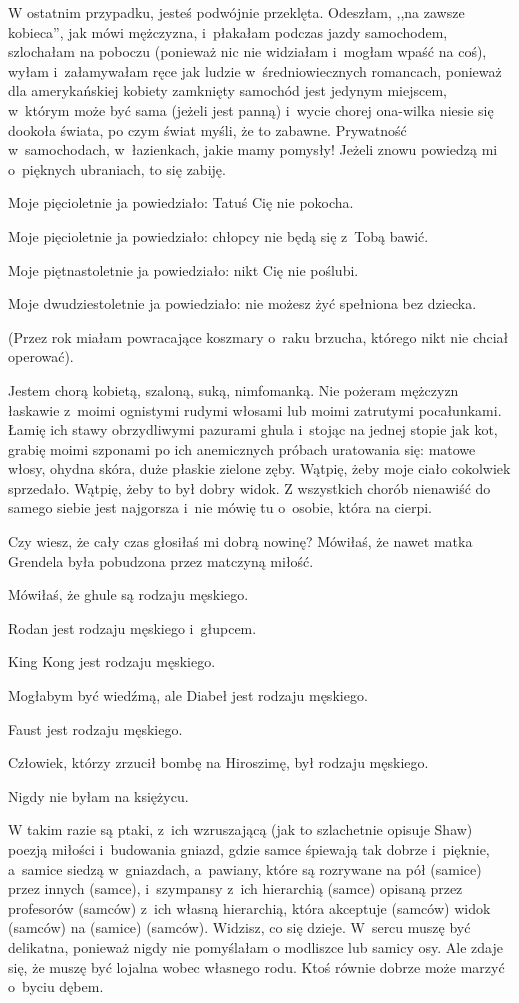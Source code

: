 \documentclass[oneside,polish,12pt,sfheadings]{mwbk}
\begin{document}
W ostatnim przypadku, jesteś podwójnie przeklęta. Odeszłam, ,,na zawsze
kobieca'', jak mówi mężczyzna, i~płakałam podczas jazdy samochodem,
szlochałam na poboczu (ponieważ nic nie widziałam i~mogłam wpaść na
coś), wyłam i~załamywałam ręce jak ludzie w~średniowiecznych romancach,
ponieważ dla amerykańskiej kobiety zamknięty samochód jest jedynym
miejscem, w~którym może być sama (jeżeli jest panną) i~wycie chorej
ona-wilka niesie się dookoła świata, po czym świat myśli, że to zabawne.
Prywatność w~samochodach, w~łazienkach, jakie mamy pomysły! Jeżeli
znowu powiedzą mi o~pięknych ubraniach, to się zabiję.

Moje pięcioletnie ja powiedziało: Tatuś Cię nie pokocha.

Moje pięcioletnie ja powiedziało: chłopcy nie będą się z~Tobą bawić.

Moje piętnastoletnie ja powiedziało: nikt Cię nie poślubi.

Moje dwudziestoletnie ja powiedziało: nie możesz żyć spełniona bez
dziecka.

(Przez rok miałam powracające koszmary o~raku brzucha, którego nikt
nie chciał operować).

Jestem chorą kobietą, szaloną, suką, nimfomanką. Nie pożeram mężczyzn
łaskawie z~moimi ognistymi rudymi włosami lub moimi zatrutymi pocałunkami.
Łamię ich stawy obrzydliwymi pazurami ghula i~stojąc na jednej stopie
jak kot, grabię moimi szponami po ich anemicznych próbach uratowania
się: matowe włosy, ohydna skóra, duże płaskie zielone zęby. Wątpię,
żeby moje ciało cokolwiek sprzedało. Wątpię, żeby to był dobry widok.
Z wszystkich chorób nienawiść do samego siebie jest najgorsza i~nie
mówię tu o~osobie, która na cierpi.

Czy wiesz, że cały czas głosiłaś mi dobrą nowinę? Mówiłaś, że nawet
matka Grendela była pobudzona przez matczyną miłość.

Mówiłaś, że ghule są rodzaju męskiego.

Rodan jest rodzaju męskiego i~głupcem.

King Kong jest rodzaju męskiego.

Mogłabym być wiedźmą, ale Diabeł jest rodzaju męskiego.

Faust jest rodzaju męskiego.

Człowiek, którzy zrzucił bombę na Hiroszimę, był rodzaju męskiego.

Nigdy nie byłam na księżycu.

W takim razie są ptaki, z~ich wzruszającą (jak to szlachetnie opisuje
Shaw) poezją miłości i~budowania gniazd, gdzie samce śpiewają tak
dobrze i~pięknie, a~samice siedzą w~gniazdach, a~pawiany, które są
rozrywane na pół (samice) przez innych (samce), i~szympansy z~ich
hierarchią (samce) opisaną przez profesorów (samców) z~ich własną hierarchią,
która akceptuje (samców) widok (samców) na (samice) (samców). Widzisz,
co się dzieje. W~sercu muszę być delikatna, ponieważ nigdy nie pomyślałam
o modliszce lub samicy osy. Ale zdaje się, że muszę być lojalna wobec
własnego rodu. Ktoś równie dobrze może marzyć o~byciu dębem.
\end{document}
